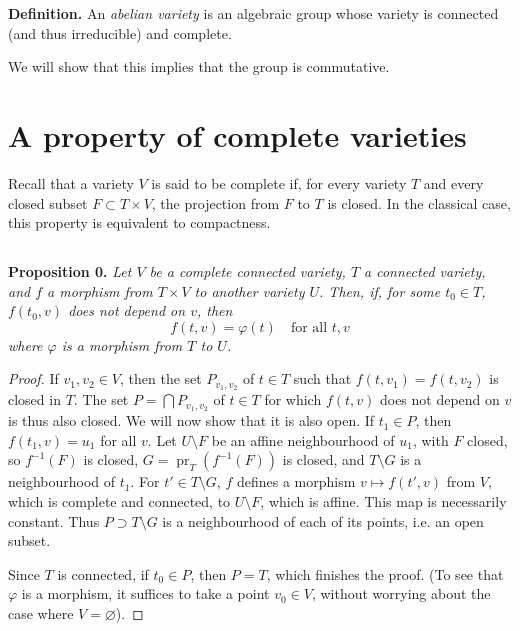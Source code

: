 \documentclass{article}
\newenvironment{itenv}[1]
  {\phantomsection\par\medskip\noindent\textbf{#1.}\itshape}
  {\medskip}
\newenvironment{rmenv}[1]
  {\phantomsection\par\medskip\noindent\textbf{#1.}\rmfamily}
  {\medskip}
\newcommand{\oldpage}[1]{\marginpar{\footnotesize$\Big\vert$ \textit{p.~#1}}}
\begin{document}
\begin{rmenv}{Definition}
  An \emph{abelian variety} is an algebraic group whose variety is connected (and thus irreducible) and complete.
\end{rmenv}

We will show that this implies that the group is commutative.


\section{A property of complete varieties}
\label{2}

Recall that a variety $V$ is said to be complete if, for every variety $T$ and every closed subset $F\subset T\times V$, the projection from $F$ to $T$ is closed.
In the classical case, this property is equivalent to compactness.


\subsection{}
\label{2.A}

\begin{itenv}{Proposition 0}
\label{proposition0}
  Let $V$ be a complete connected variety, $T$ a connected variety, and $f$ a morphism from $T\times V$ to another variety $U$.
  Then, if, for some $t_0\in T$, $f(t_0,v)$ does not depend on $v$, then
  \[
    f(t,v)=\varphi(t)
    \quad\mbox{for all $t,v$}
  \]
  where $\varphi$ is a morphism from $T$ to $U$.
\end{itenv}

\oldpage{9-02}
\begin{proof}
  If $v_1,v_2\in V$, then the set $P_{v_1,v_2}$ of $t\in T$ such that $f(t,v_1)=f(t,v_2)$ is closed in $T$.
  The set $P=\bigcap P_{v_1,v_2}$ of $t\in T$ for which $f(t,v)$ does not depend on $v$ is thus also closed.
  We will now show that it is also open.
  If $t_1\in P$, then $f(t_1,v)=u_1$ for all $v$.
  Let $U\setminus F$ be an affine neighbourhood of $u_1$, with $F$ closed, so $f^{-1}(F)$ is closed, $G=\operatorname{pr}_T(f^{-1}(F))$ is closed, and $T\setminus G$ is a neighbourhood of $t_1$.
  For $t'\in T\setminus G$, $f$ defines a morphism $v\mapsto f(t',v)$ from $V$, which is complete and connected, to $U\setminus F$, which is affine.
  This map is necessarily constant.
  Thus $P\supset T\setminus G$ is a neighbourhood of each of its points, i.e. an open subset.

  Since $T$ is connected, if $t_0\in P$, then $P=T$, which finishes the proof.
  (To see that $\varphi$ is a morphism, it suffices to take a point $v_0\in V$, without worrying about the case where $V=\varnothing$).
\end{proof}
\end{document}
